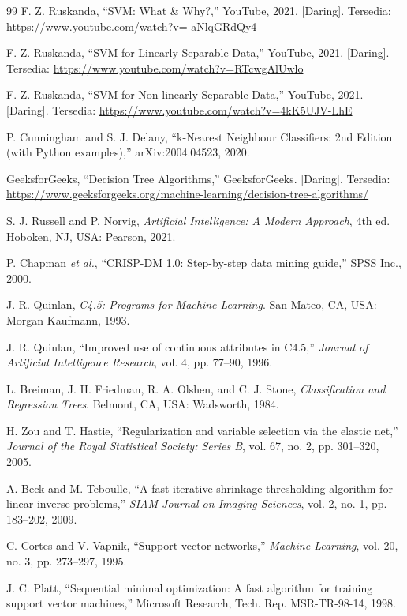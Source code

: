 \begin{thebibliography}{99}
F. Z. Ruskanda, ``SVM: What \& Why?,'' YouTube, 2021. [Daring]. Tersedia: \url{https://www.youtube.com/watch?v=-aNlqGRdQy4}

F. Z. Ruskanda, ``SVM for Linearly Separable Data,'' YouTube, 2021. [Daring]. Tersedia: \url{https://www.youtube.com/watch?v=RTcwgAlUwlo}

F. Z. Ruskanda, ``SVM for Non-linearly Separable Data,'' YouTube, 2021. [Daring]. Tersedia: \url{https://www.youtube.com/watch?v=4kK5UJV-LhE}

P. Cunningham and S. J. Delany, ``k-Nearest Neighbour Classifiers: 2nd Edition (with Python examples),'' arXiv:2004.04523, 2020.

GeeksforGeeks, ``Decision Tree Algorithms,'' GeeksforGeeks. [Daring]. Tersedia: \url{https://www.geeksforgeeks.org/machine-learning/decision-tree-algorithms/}

S. J. Russell and P. Norvig, \emph{Artificial Intelligence: A Modern Approach}, 4th ed. Hoboken, NJ, USA: Pearson, 2021.

P. Chapman \emph{et al.}, ``CRISP-DM 1.0: Step-by-step data mining guide,'' SPSS Inc., 2000.

J. R. Quinlan, \emph{C4.5: Programs for Machine Learning}. San Mateo, CA, USA: Morgan Kaufmann, 1993.

J. R. Quinlan, ``Improved use of continuous attributes in C4.5,'' \emph{Journal of Artificial Intelligence Research}, vol. 4, pp. 77--90, 1996.

L. Breiman, J. H. Friedman, R. A. Olshen, and C. J. Stone, \emph{Classification and Regression Trees}. Belmont, CA, USA: Wadsworth, 1984.

H. Zou and T. Hastie, ``Regularization and variable selection via the elastic net,'' \emph{Journal of the Royal Statistical Society: Series B}, vol. 67, no. 2, pp. 301--320, 2005.

A. Beck and M. Teboulle, ``A fast iterative shrinkage-thresholding algorithm for linear inverse problems,'' \emph{SIAM Journal on Imaging Sciences}, vol. 2, no. 1, pp. 183--202, 2009.

C. Cortes and V. Vapnik, ``Support-vector networks,'' \emph{Machine Learning}, vol. 20, no. 3, pp. 273--297, 1995.

J. C. Platt, ``Sequential minimal optimization: A fast algorithm for training support vector machines,'' Microsoft Research, Tech. Rep. MSR-TR-98-14, 1998.


\end{thebibliography}
